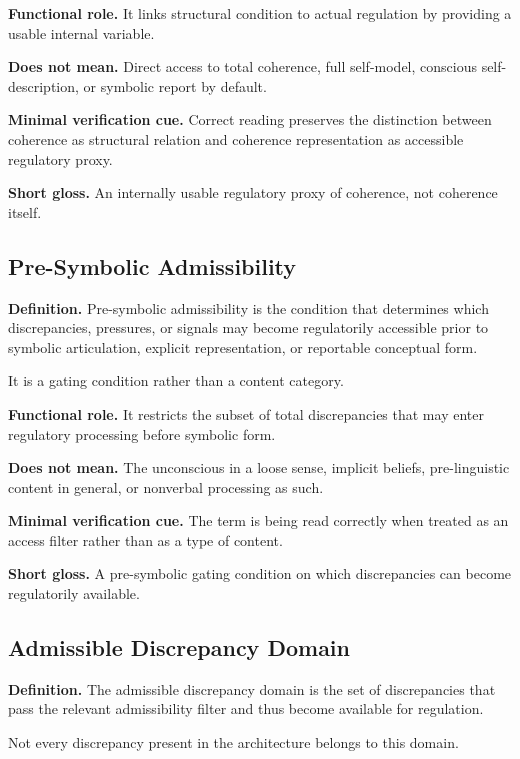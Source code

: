 \documentclass[11pt,a4paper]{article}
\begin{document}
	\textbf{Functional role.} It links structural condition to actual regulation by providing a usable internal variable.
	
	\textbf{Does not mean.} Direct access to total coherence, full self-model, conscious self-description, or symbolic report by default.
	
	\textbf{Minimal verification cue.} Correct reading preserves the distinction between coherence as structural relation and coherence representation as accessible regulatory proxy.
	
	\textbf{Short gloss.} An internally usable regulatory proxy of coherence, not coherence itself.
	
	\subsection{Pre-Symbolic Admissibility}
	
	\textbf{Definition.} Pre-symbolic admissibility is the condition that determines which discrepancies, pressures, or signals may become regulatorily accessible prior to symbolic articulation, explicit representation, or reportable conceptual form.
	
	It is a gating condition rather than a content category.
	
	\textbf{Functional role.} It restricts the subset of total discrepancies that may enter regulatory processing before symbolic form.
	
	\textbf{Does not mean.} The unconscious in a loose sense, implicit beliefs, pre-linguistic content in general, or nonverbal processing as such.
	
	\textbf{Minimal verification cue.} The term is being read correctly when treated as an access filter rather than as a type of content.
	
	\textbf{Short gloss.} A pre-symbolic gating condition on which discrepancies can become regulatorily available.
	
	\subsection{Admissible Discrepancy Domain}
	
	\textbf{Definition.} The admissible discrepancy domain is the set of discrepancies that pass the relevant admissibility filter and thus become available for regulation.
	
	Not every discrepancy present in the architecture belongs to this domain.
	
\end{document}
